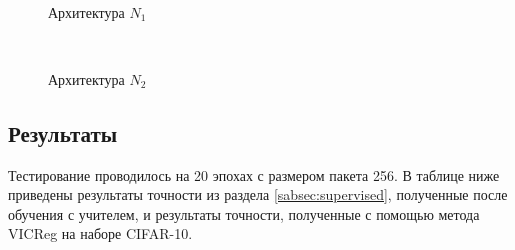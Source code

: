 \begin{figure}[H]
    \begin{minipage}[h]{0.5\linewidth}
         \\
        \caption{Архитектура $N_1$}
        \label{TSNE_arch_1}
    \end{minipage}
    \hfill
    \begin{minipage}[h]{0.5\linewidth}
         \\
        \caption{Архитектура $N_2$}
        \label{TSNE_arch_2}
    \end{minipage}
\end{figure}

\subsection{Результаты}

Тестирование проводилось на 20 эпохах с размером пакета 256. В таблице ниже приведены результаты точности из раздела \ref{sabsec:supervised}, полученные после обучения с учителем, и результаты точности, полученные с помощью метода VICReg на наборе CIFAR-10.


